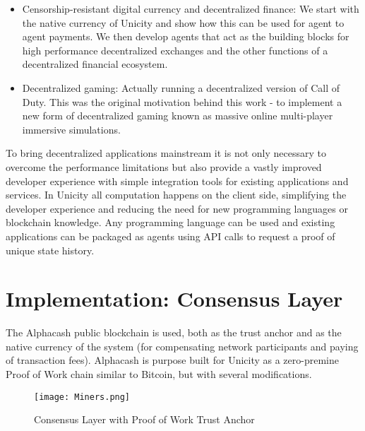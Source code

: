 \documentclass{article}
\begin{document}
\begin{itemize}
\setlength{\leftmargin}{1em}
 \item Censorship-resistant digital currency and decentralized finance:  We start with the native currency of Unicity and show how this can be used for agent to agent payments. We then develop agents that act as the building blocks for high performance decentralized exchanges and the other functions of a decentralized financial ecosystem.
 \item Decentralized gaming: Actually running a decentralized version of Call of Duty.  This was the original motivation behind this work - to implement a new form of decentralized gaming known as massive online multi-player immersive simulations.
\end{itemize}


To bring decentralized applications mainstream it is not only necessary to overcome the performance limitations but also provide a vastly improved developer experience with simple integration tools for existing applications and services. In Unicity all computation happens on the client side, simplifying the developer experience and reducing the need for new programming languages or blockchain knowledge. Any programming language can be used and existing applications can be packaged as agents  using API calls to request a proof of unique state history.


\section{Implementation: Consensus Layer}

The Alphacash public blockchain is used, both as the trust anchor and as the native currency of the system (for compensating network participants and paying of transaction fees). Alphacash is purpose built for Unicity as a zero-premine Proof of Work chain similar to Bitcoin, but with several modifications.

\begin{figure}[htbp]
    \centering
    \texttt{[image: Miners.png]}
    \caption{Consensus Layer with Proof of Work Trust Anchor}
    \label{fig:miners}
\end{figure}
\end{document}
